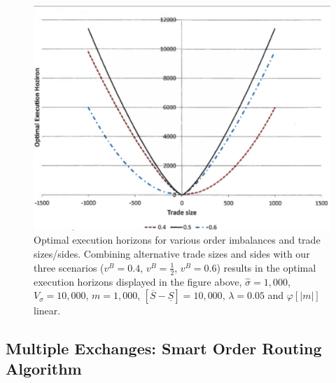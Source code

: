         \begin{figure}[!ht] 
        \centering
        \includegraphics[width=\textwidth]{chapters/chapter_exec_models/figures/fig3temp.png}
         \caption{Optimal execution horizons for various order imbalances and trade sizes/sides. Combining alternative trade sizes and sides with our three scenarios ($v^B=0.4$, $v^B=\frac{1}{2}$, $v^B=0.6$) results in the optimal execution horizons displayed in the figure above, $\hat{\sigma}=1,000$, $V_\sigma=10,000$, $m=1,000$, $[\overline{S}-\underline{S}]=10,000$, $\lambda=0.05$ and $\varphi[|m|]$ linear. \label{fig:3temp}}
        \end{figure} 



\subsection{Multiple Exchanges:  Smart Order Routing Algorithm}


